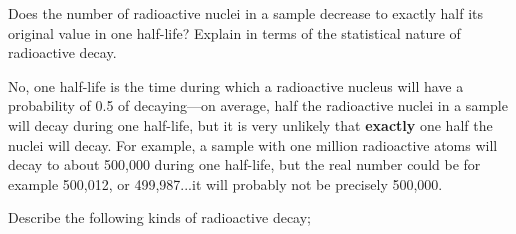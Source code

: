 \documentclass[12pt]{exam}
\begin{document}
\begin{questions}

\question Does the number of radioactive nuclei in a sample decrease to exactly half its original value in one half-life? Explain in terms of the statistical nature of radioactive decay.
	\begin{TheSolution}
	No, one half-life is the time during which a radioactive nucleus will have a probability of 0.5 of decaying---on average, half the radioactive nuclei in a sample will decay during one half-life, but it is very unlikely that \textbf{exactly} one half the nuclei will decay. For example, a sample with one million radioactive atoms will decay to about 500,000 during one half-life, but the real number could be for example 500,012, or 499,987...it will probably not be precisely 500,000.
\end{TheSolution}
	
	\question Describe the following kinds of radioactive decay;
		\begin{parts}

\end{parts}
\end{questions}
\end{document}
